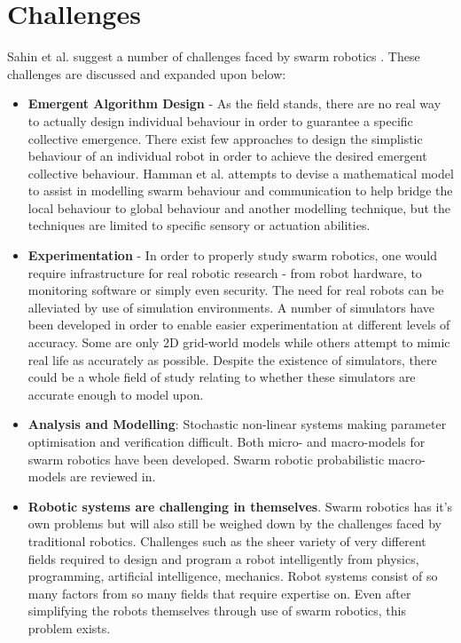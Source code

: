 \section{Challenges}
Sahin et al. suggest a number of challenges faced by swarm robotics \cite{csahin2008special}. These challenges are discussed and expanded upon below: 

\begin{itemize}

\item \textbf{Emergent Algorithm Design} - As the field stands, there are no real way to actually design individual behaviour in order to guarantee a specific collective emergence. There exist few approaches to design the simplistic behaviour of an individual robot in order to achieve the desired emergent collective behaviour. Hamman et al. attempts to devise a mathematical model to assist in modelling swarm behaviour and communication\cite{hamann2008framework} to help bridge the local behaviour to global behaviour and another modelling technique, but the techniques are limited to specific sensory or actuation abilities. 

\item \textbf{Experimentation} - In order to properly study swarm robotics, one would require infrastructure for real robotic research - from robot hardware, to monitoring software or simply even security. The need for real robots can be alleviated by use of simulation environments. A number of simulators have been developed in order to enable easier experimentation at different levels of accuracy. Some are only 2D grid-world models while others attempt to mimic real life as accurately as possible. Despite the existence of simulators, there could be a whole field of study relating to whether these simulators are accurate enough to model upon.

\item \textbf{Analysis and Modelling}: Stochastic non-linear systems making parameter optimisation and verification difficult. Both micro- and macro-models for swarm robotics have been developed. Swarm robotic probabilistic macro-models are reviewed in\cite{lerman2005review}.

\item \textbf{Robotic systems are challenging in themselves}. Swarm robotics has it's own problems but will also still be weighed down by the challenges faced by traditional robotics. Challenges such as the sheer variety of very different fields required to design and program a robot intelligently from physics, programming, artificial intelligence, mechanics. Robot systems consist of so many factors from so many fields that require expertise on. Even after simplifying the robots themselves through use of swarm robotics, this problem exists.

\end{itemize}


